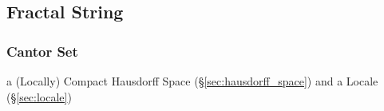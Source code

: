 \subsection{Fractal String}\label{sec:fractal_string}

\subsubsection{Cantor Set}\label{sec:cantor_set}

a (Locally) Compact Hausdorff Space (\S\ref{sec:hausdorff_space}) and a Locale
(\S\ref{sec:locale})
